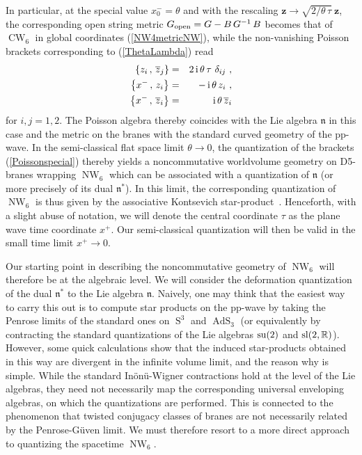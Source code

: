 \documentclass[11pt,a4paper]{article}
\DeclareMathOperator{\AdS}{AdS}
\DeclareMathOperator{\Sphere}{S}
\DeclareMathOperator{\NW}{NW}
\DeclareMathOperator{\CW}{CW}
\let\S\Sphere
\newcommand{\1}{\mathbb{1}}
\newcommand{\mbf}[1]{{\boldsymbol {#1} }}
\def\ii{{\,{\rm i}\,}}
\def\mz{{\mbf z}}
\newcommand{\real}{{\mathbb R}} %
\newcommand{\beq}{\begin{eqnarray}}
\newcommand{\eeq}{\end{eqnarray}}
\begin{document}
In particular, at the special value
$x_0^-=\theta$ and with the rescaling $\mz\to\sqrt{2/\theta\,\tau}~\mz$, the
corresponding open string metric $G_{\rm open}=G-B\,G^{-1}\,B$ becomes
that of $\CW_6$ in global coordinates (\ref{NW4metricNW}), while the
non-vanishing Poisson brackets corresponding to (\ref{ThetaLambda})
read
\beq
\left\{z_i\,,\,\overline{z}_j\right\}&=&2\ii\theta\,\tau~\delta_{ij} \ ,
\nonumber\\ \left\{x^-\,,\,z_i\right\}&=&-\ii\theta\,z_i \ ,
\nonumber\\ \left\{x^-\,,\,\overline{z}_i\right\}&=&\ii\theta\,
\overline{z}_i
\label{Poissonspecial}\eeq
for $i,j=1,2$. The Poisson algebra thereby coincides with the
Lie algebra $\mathfrak{n}$ in this case and the metric
on the branes with the standard curved geometry of the pp-wave. In the
semi-classical flat space limit $\theta\to0$, the
quantization of the brackets (\ref{Poissonspecial}) thereby yields a
noncommutative worldvolume geometry on D5-branes wrapping $\NW_6$
which can be associated with a quantization of $\mathfrak{n}$ (or
more precisely of its dual $\mathfrak{n}^*$). In this limit, the
corresponding quantization of $\NW_6$ is thus given by the associative
Kontsevich star-product~\cite{Kont1}. Henceforth, with a slight abuse
of notation, we will denote the central coordinate $\tau$ as the plane
wave time coordinate $x^+$. Our semi-classical quantization will then
be valid in the small time limit $x^+\to0$.

Our starting point in describing the noncommutative geometry of
$\NW_6$ will therefore be at the algebraic level. We will consider the
deformation quantization of the dual $\mathfrak{n}^*$ to the Lie
algebra $\mathfrak{n}$. Naively,
one may think that the easiest way to carry this out is to compute star
products on the pp-wave by taking the Penrose limits of the
standard ones on $\S^3$ and $\AdS_3$ (or equivalently by contracting
the standard quantizations of the Lie algebras ${\rm su}(2)$ and ${\rm
  sl}(2,\real)$). However, some quick calculations show that the
induced star-products obtained in this way are divergent in the
infinite volume limit, and the reason why is
simple. While the standard In\"on\"u-Wigner contractions hold at the
level of the Lie algebras, they need not necessarily map the
corresponding universal enveloping algebras, on
which the quantizations are performed. This is connected to the
phenomenon that twisted conjugacy classes of branes are not
necessarily related by the Penrose-G\"uven limit. We must therefore
resort to a more direct approach to quantizing the spacetime $\NW_6$.
\end{document}
